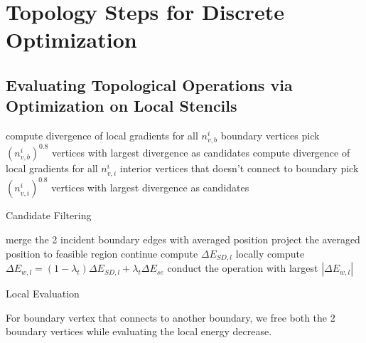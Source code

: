 \section{Topology Steps for Discrete Optimization}

\subsection{Evaluating Topological Operations via Optimization on Local Stencils}

\begin{algorithm}[h]
\SetAlgoLined
{}
{
  compute divergence of local gradients for all $n_{v,b}^i$ boundary vertices\;
  pick $(n_{v,b}^i)^{0.8}$ vertices with largest divergence as candidates\;
}
{
  compute divergence of local gradients for all $n_{v,i}^i$ interior vertices that doesn't connect to boundary\;
  pick $(n_{v,i}^i)^{0.8}$ vertices with largest divergence as candidates\;
}
\caption{Candidate Filtering}
\end{algorithm}

\begin{algorithm}[h]
\SetAlgoLined
{}
{
  {
    merge the 2 incident boundary edges with averaged position\;
    {
      project the averaged position to feasible region\;
      {
        continue\;
      }
    }
    compute $\Delta E_{SD,l}$ locally\;
    compute $\Delta E_{w,l} = (1-\lambda_t)\Delta E_{SD,l}+\lambda_t \Delta E_{se}$
  }
}
conduct the operation with largest $|\Delta E_{w,l}|$
\caption{Local Evaluation}
\end{algorithm}
For boundary vertex that connects to another boundary, we free both the 2 boundary vertices while evaluating the local energy decrease.


